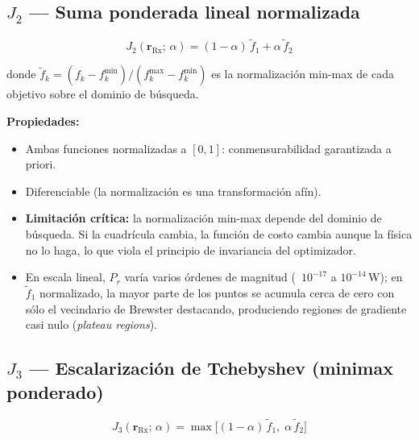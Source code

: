 \documentclass[11pt, a4paper]{article}
\newcommand{\Rx}{\mathrm{Rx}}
\newcommand{\rRx}{\mathbf{r}_{\Rx}}
\begin{document}
\subsection{\texorpdfstring{$J_2$}{J2} — Suma ponderada lineal normalizada}

\begin{equation}
  J_2(\rRx;\,\alpha) = (1-\alpha)\,\tilde{f}_1 + \alpha\,\tilde{f}_2
  \label{eq:J2}
\end{equation}

donde $\tilde{f}_k = (f_k - f_k^{\min}) / (f_k^{\max} - f_k^{\min})$ es la
normalización min-max de cada objetivo sobre el dominio de búsqueda.

\textbf{Propiedades:}
\begin{itemize}
  \item Ambas funciones normalizadas a $[0,1]$: conmensurabilidad garantizada a priori.
  \item Diferenciable (la normalización es una transformación afín).
  \item \textbf{Limitación crítica:} la normalización min-max depende del dominio de
    búsqueda. Si la cuadrícula cambia, la función de costo cambia aunque la física no
    lo haga, lo que viola el principio de invariancia del optimizador.
  \item En escala lineal, $P_r$ varía varios órdenes de magnitud (~$10^{-17}$ a
    $10^{-14}$\,W); en $\tilde{f}_1$ normalizado, la mayor parte de los puntos se
    acumula cerca de cero con sólo el vecindario de Brewster destacando, produciendo
    regiones de gradiente casi nulo (\emph{plateau regions}).
\end{itemize}

\subsection{\texorpdfstring{$J_3$}{J3} — Escalarización de Tchebyshev (minimax ponderado)}

\begin{equation}
  J_3(\rRx;\,\alpha) = \max\!\bigl[(1-\alpha)\,\tilde{f}_1,\;\alpha\,\tilde{f}_2\bigr]
  \label{eq:J3}
\end{equation}
\end{document}
